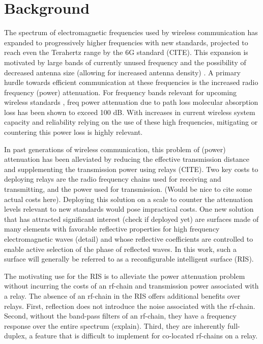 \documentclass[12pt,a4paper]{report}
\begin{document}
\section{Background}\label{Background}
The spectrum of electromagnetic frequencies used by wireless communication has expanded to progressively higher frequencies with new standards, projected to reach even the Terahertz range by the 6G standard (CITE). This expansion is motivated by large bands of currently unused frequency
and the possibility of decreased antenna size (allowing for increased antenna density) \cite{akyildiz2018combating}. A primary hurdle towards efficient communication at these frequencies is the increased radio frequency (power) attenuation. For frequency bands relevant for upcoming wireless standards , freq power attenuation due to path loss  molecular absorption loss
has been shown to exceed 100 dB. With increases in current wireless system capacity and reliability relying on the use of these high frequencies, mitigating or countering this power loss  is highly relevant.
\par
In past generations of wireless communication, this problem of (power) attenuation has been alleviated by reducing the effective transmission distance 
and supplementing the transmission power using relays (CITE). Two key costs to deploying relays are the radio frequency chains used for receiving and transmitting, and the power used for transmission. (Would be nice to cite some actual costs here). Deploying this solution on a scale to counter
the attenuation levels relevant to new standards would pose impractical costs. One new solution that has attracted significant interest (check if deployed yet) are surfaces made of many elements with favorable reflective properties for high frequency electromagnetic waves (detail) and whose reflective coefficients are controlled to enable active selection of the phase of reflected waves. In this work, such a surface will generally be referred to as a reconfigurable intelligent surface (RIS).
\par
The motivating use for the RIS is to alleviate the power attenuation problem without incurring the costs of an rf-chain and transmission power 
associated with a relay. The absence of an rf-chain in the RIS offers additional benefits over relays. First, reflection does not introduce the noise associated with the rf-chain. Second, without the band-pass filters of an rf-chain, they have a frequency response over the entire spectrum (explain). Third, they are inherently full-duplex, a feature that is difficult to implement for co-located rf-chains on a relay. 
\end{document}
